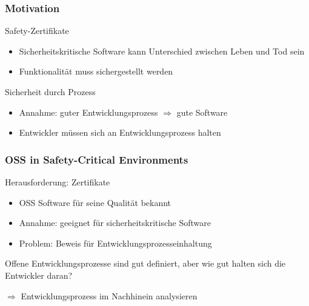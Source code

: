 \documentclass{beamer}
\begin{document}
	\begin{frame}
	\frametitle{Motivation}
	\begin{block}{Safety-Zertifikate}
		\begin{itemize}
			\item Sicherheitskritische Software kann Unterschied zwischen Leben und Tod sein
			\item Funktionalität muss sichergestellt werden
		\end{itemize}
	\end{block}
	\begin{block}{Sicherheit durch Prozess}
		\begin{itemize}
			\item Annahme: guter Entwicklungsprozess $\Rightarrow$ gute Software
			\item Entwickler müssen sich an Entwicklungsprozess halten
		\end{itemize}
	\end{block}
	\centering

	\end{frame}

	\begin{frame}
	\frametitle{OSS in Safety-Critical Environments}
	\begin{block}{Herausforderung: Zertifikate}
		\begin{itemize}
			\item OSS Software für seine Qualität bekannt
			\item Annahme: geeignet für sicherheitskritische Software
			\item Problem: Beweis für Entwicklungsprozesseinhaltung
		\end{itemize}
	\end{block}

	\centering
	Offene Entwicklungsprozesse sind gut definiert, aber wie gut halten sich die Entwickler daran?

	$\Rightarrow$ Entwicklungsprozess im Nachhinein analysieren
	\end{frame}
\end{document}
